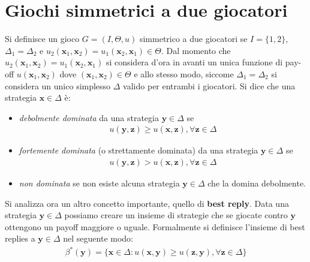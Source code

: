 \newpage

\section{Giochi simmetrici a due giocatori} %
\label{sec:giochi_simmetrici_a_due_giocatori}
Si definisce un gioco $G=(I, \Theta, u)$ simmetrico a due giocatori se $I=\{1,2\}$, $\Delta_1 = \Delta_2$ e $u_2(\mathbf{x}_1, \mathbf{x}_2) = u_1(\mathbf{x}_2, \mathbf{x}_1) \in \Theta$. Dal momento che $u_2(\mathbf{x}_1, \mathbf{x}_2) = u_1(\mathbf{x}_2, \mathbf{x}_1)$ si considera d'ora in avanti un unica funzione di pay-off $u(\mathbf{x}_1, \mathbf{x}_2)$ dove $(\mathbf{x}_1, \mathbf{x}_2) \in \Theta$ e allo stesso modo, siccome $\Delta_1 = \Delta_2$ si considera un unico simplesso $\Delta$ valido per entrambi i giocatori. Si dice che una strategia $\mathbf{x} \in \Delta$ è:
\begin{itemize}
    \item \emph{debolmente dominata} da una strategia $\mathbf{y} \in \Delta$ se
    \begin{align*}
         u(\mathbf{y}, \mathbf{z}) \geq u(\mathbf{x}, \mathbf{z}), \forall \mathbf{z} \in \Delta
    \end{align*}
    \item \emph{fortemente dominata} (o strettamente dominata) da una strategia $\mathbf{y} \in \Delta$ se
    \begin{align*}
         u(\mathbf{y}, \mathbf{z}) > u(\mathbf{x}, \mathbf{z}), \forall \mathbf{z} \in \Delta
    \end{align*}
    \item \emph{non dominata} se non esiste alcuna strategia $\mathbf{y} \in \Delta$ che la domina debolmente.
\end{itemize}

Si analizza ora un altro concetto importante, quello di \textbf{best reply}. Data una strategia $\mathbf{y} \in \Delta$ possiamo creare un insieme di strategie che se giocate contro $\mathbf{y}$ ottengono un payoff maggiore o uguale. Formalmente si definisce l’insieme di best replies a $\mathbf{y} \in \Delta$ nel seguente modo:
\begin{align}
    \beta^*(\mathbf{y}) = \{\mathbf{x} \in \Delta : u(\mathbf{x}, \mathbf{y}) \geq u(\mathbf{z}, \mathbf{y}), \forall \mathbf{z} \in \Delta \}
\end{align}

